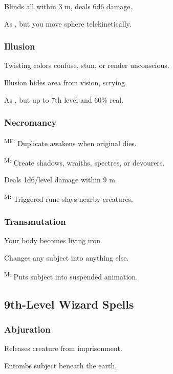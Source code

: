 	 Blinds all within 3 m, deals 6d6 damage.

	 As , but you move sphere telekinetically.

\subsubsection{Illusion}
	 Twisting colors confuse, stun, or render unconscious.

	 Illusion hides area from vision, scrying.

	 As , but up to 7th level and 60\% real.

\subsubsection{Necromancy}
	\textsuperscript{MF:} Duplicate awakens when original dies.

	\textsuperscript{M:} Create shadows, wraiths, spectres, or devourers.

	 Deals 1d6/level damage within 9 m.

	\textsuperscript{M:} Triggered rune slays nearby creatures.

\subsubsection{Transmutation}
	 Your body becomes living iron.

	 Changes any subject into anything else.

	\textsuperscript{M:} Puts subject into suspended animation.



\subsection{9th-Level Wizard Spells}

\subsubsection{Abjuration}
	 Releases creature from imprisonment.

	 Entombs subject beneath the earth.

